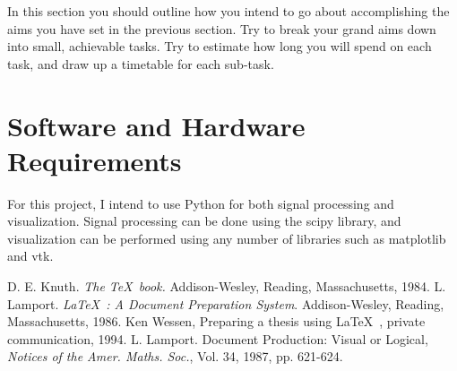\documentclass[12pt, a4paper]{article}
\begin{document}
In this section you should outline how you intend to go
about accomplishing the aims you have set in the previous
section. Try to break your grand aims down into small,
achievable tasks. Try to estimate how long you will
spend on each task, and draw up a timetable for each
sub-task.

\section*{Software and Hardware Requirements}

For this project, I intend to use Python for both signal processing and
visualization. Signal processing can be done using the scipy library, and
visualization can be performed using any number of libraries such as
matplotlib and vtk.

\begin{thebibliography}{9}
 D. E. Knuth. {\em The \TeX~book.}\/ Addison-Wesley,
Reading, Massachusetts, 1984.
 L. Lamport. {\em \LaTeX~: A Document Preparation
System}.\/ Addison-Wesley, Reading, Massachusetts, 1986.
 Ken Wessen, Preparing a thesis using \LaTeX~, private
communication, 1994.
 L. Lamport. Document Production: Visual
or Logical, {\em Notices of the Amer. Maths. Soc.},\/ Vol. 34,
1987, pp. 621-624.
\end{thebibliography}
\end{document}
